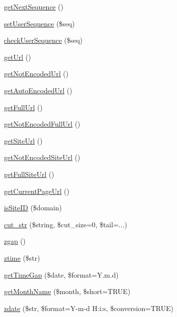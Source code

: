 \begin{DoxyCompactItemize}
\item 
\hyperlink{func_8inc_8php_a5a97b458f9c5b4fe3574671840aee27c}{get\+Next\+Sequence} ()
\item 
\hyperlink{func_8inc_8php_aa3832c4893dae39987cf056c24c29392}{set\+User\+Sequence} (\$seq)
\item 
\hyperlink{func_8inc_8php_a56536fb66de4e320aaac07b82e6c2e21}{check\+User\+Sequence} (\$seq)
\item 
\hyperlink{func_8inc_8php_accd14bda49a1044b4d8dd93f020f11ee}{get\+Url} ()
\item 
\hyperlink{func_8inc_8php_aa73dbeb07c5bcac26c24fe4c6b05d8d2}{get\+Not\+Encoded\+Url} ()
\item 
\hyperlink{func_8inc_8php_a77e631a54eea5ecea3a77feb56129104}{get\+Auto\+Encoded\+Url} ()
\item 
\hyperlink{func_8inc_8php_acaf8f155dd27e065b7fb0f5c3f702027}{get\+Full\+Url} ()
\item 
\hyperlink{func_8inc_8php_a06116450c538bd1f67cf3209bfd16610}{get\+Not\+Encoded\+Full\+Url} ()
\item 
\hyperlink{func_8inc_8php_a2d80ea9652d1586d5dcd03d022150f73}{get\+Site\+Url} ()
\item 
\hyperlink{func_8inc_8php_aa09cef59156d4afaeee54a675605f95d}{get\+Not\+Encoded\+Site\+Url} ()
\item 
\hyperlink{func_8inc_8php_a778b55fa9ebcf9a5ef0b017b998d9894}{get\+Full\+Site\+Url} ()
\item 
\hyperlink{func_8inc_8php_ae9a94dea2a8e11ebf9010683a124fabf}{get\+Current\+Page\+Url} ()
\item 
\hyperlink{func_8inc_8php_aa85a46b82e60cc2c64682ea6464eeeff}{is\+Site\+ID} (\$domain)
\item 
\hyperlink{func_8inc_8php_ad4b9b78b91551f1c4531b855282a8f0c}{cut\+\_\+str} (\$string, \$cut\+\_\+size=0, \$tail=\textquotesingle{}...\textquotesingle{})
\item 
\hyperlink{func_8inc_8php_acac2e71b99c40a4736c3ba62c0b8ac70}{zgap} ()
\item 
\hyperlink{func_8inc_8php_afa835b7d80cf54db78fd0cb7d81c7968}{ztime} (\$str)
\item 
\hyperlink{func_8inc_8php_abe1c0e6494d10206300f3bc4c65d8b55}{get\+Time\+Gap} (\$date, \$format=\textquotesingle{}Y.\+m.\+d\textquotesingle{})
\item 
\hyperlink{func_8inc_8php_adc2ced210718f27abac98392564a7b82}{get\+Month\+Name} (\$month, \$short=T\+R\+UE)
\item 
\hyperlink{func_8inc_8php_ace4e8c79079e48b6d72ca086e973340f}{zdate} (\$str, \$format=\textquotesingle{}Y-\/m-\/d H\+:i\+:s\textquotesingle{}, \$conversion=T\+R\+UE)

\end{DoxyCompactItemize}
